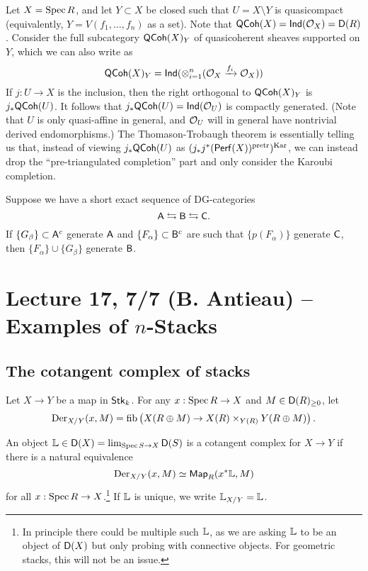 \documentclass{amsart}
\begin{document}
\begin{ex}
	Let $X = \operatorname{Spec} R$, and let $Y \subset X$ be closed such that $U = X \setminus Y$ is quasicompact (equivalently, $Y = V(f_1, \dots, f_n)$ as a set).
	Note that $\mathsf{QCoh}(X) = \mathsf{Ind}(\mathcal{O}_X) = \mathsf{D}(R)$.
	Consider the full subcategory $\mathsf{QCoh}(X)_Y$ of quasicoherent sheaves supported on $Y$, which we can also write as
	\[
		\mathsf{QCoh}(X)_Y = \mathsf{Ind}(\otimes_{i=1}^n (\mathcal{O}_X \xrightarrow{f_i} \mathcal{O}_X))
	\]
	If $j: U \to X$ is the inclusion, then the right orthogonal to $\mathsf{QCoh}(X)_Y$ is $j_* \mathsf{QCoh}(U)$.
	It follows that $j_* \mathsf{QCoh}(U) = \mathsf{Ind}(\mathcal{O}_U)$ is compactly generated.
	(Note that $U$ is only quasi-affine in general, and $\mathcal{O}_U$ will in general have nontrivial derived endomorphisms.)
	The Thomason-Trobaugh theorem is essentially telling us that, instead of viewing $j_* \mathsf{QCoh}(U)$ as $(j_* j^*(\mathsf{Perf}(X))^{\mathrm{pretr}})^{\mathrm{Kar}}$, we can instead drop the ``pre-triangulated completion'' part and only consider the Karoubi completion.
\end{ex}

\begin{exer}
	Suppose we have a short exact sequence of DG-categories
	\[
		\mathsf{A} \leftrightarrows \mathsf{B} \leftrightarrows \mathsf{C}.
	\]
	If $\{ G_\beta \} \subset \mathsf{A}^c$ generate $\mathsf{A}$ and $\{ F_\alpha \} \subset \mathsf{B}^c$ are such that $\{ p(F_\alpha) \}$ generate $\mathsf{C}$, then $\{ F_\alpha \} \cup \{ G_\beta \}$ generate $\mathsf{B}$.
\end{exer}

\section{Lecture 17, 7/7 (B. Antieau) -- Examples of $n$-Stacks}

\subsection{The cotangent complex of stacks}

Let $X \to Y$ be a map in $\mathsf{Stk}_k$.
For any $x: \operatorname{Spec} R \to X$ and $M \in \mathsf{D}(R)_{\geq 0}$, let
\[
	\operatorname{Der}_{X/Y}(x, M) = \operatorname{fib}\left(X(R \oplus M) \to X(R) \times_{Y(R)} Y(R \oplus M)\right).
\]

\begin{dfn}
	An object $\mathbb{L} \in \mathsf{D}(X) = \lim_{\operatorname{Spec} S \to X} \mathsf{D}(S)$ is a cotangent complex for $X \to Y$ if there is a natural equivalence
	\[
		\operatorname{Der}_{X/Y}(x, M) \simeq \mathsf{Map}_R(x^* \mathbb{L}, M)
	\]
	for all $x: \operatorname{Spec} R \to X$.\footnote{In principle there could be multiple such $\mathbb{L}$, as we are asking $\mathbb{L}$ to be an object of $\mathsf{D}(X)$ but only probing with connective objects.
	For geometric stacks, this will not be an issue.}
	If $\mathbb{L}$ is unique, we write $\mathbb{L}_{X/Y} = \mathbb{L}$.
\end{dfn}
\end{document}
